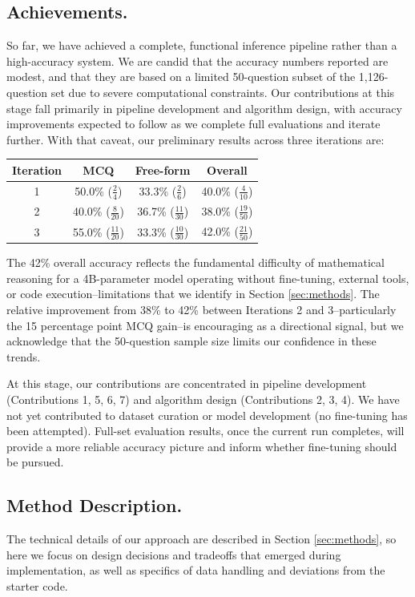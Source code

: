 \documentclass{article}
\begin{document}
\subsection{Achievements.}
So far, we have achieved a complete, functional inference pipeline rather than a high-accuracy system. We are candid that the accuracy numbers reported are modest, and that they are based on a limited 50-question subset of the 1,126-question set due to severe computational constraints. Our contributions at this stage fall primarily in pipeline development and algorithm design, with accuracy improvements expected to follow as we complete full evaluations and iterate further. With that caveat, our preliminary results across three iterations are:
\begin{center}
    \def\arraystretch{2.0}
    \begin{tabular}{||c | c c c||}
        \hline
        \textbf{Iteration} & \textbf{MCQ} & \textbf{Free-form} & \textbf{Overall}\\
        \hline
        1 & 50.0\% ($\frac{2}{4}$) & 33.3\% ($\frac{2}{6}$) & 40.0\% ($\frac{4}{10}$)\\
        \hline
        2 & 40.0\% ($\frac{8}{20}$) & 36.7\% ($\frac{11}{30}$) & 38.0\% ($\frac{19}{50}$)\\
        \hline
        3 & 55.0\% ($\frac{11}{20}$) & 33.3\% ($\frac{10}{30}$) & 42.0\% ($\frac{21}{50}$)\\
        \hline
    \end{tabular}
\end{center}
The 42\% overall accuracy reflects the fundamental difficulty of mathematical reasoning for a 4B-parameter model operating without fine-tuning, external tools, or code execution--limitations that we identify in Section \ref{sec:methods}. The relative improvement from 38\% to 42\% between Iterations 2 and 3--particularly the 15 percentage point MCQ gain--is encouraging as a directional signal, but we acknowledge that the 50-question sample size limits our confidence in these trends. 

At this stage, our contributions are concentrated in pipeline development (Contributions 1, 5, 6, 7) and algorithm design (Contributions 2, 3, 4). We have not yet contributed to dataset curation or model development (no fine-tuning has been attempted). Full-set evaluation results, once the current run completes, will provide a more reliable accuracy picture and inform whether fine-tuning should be pursued.

\subsection{Method Description.}
The technical details of our approach are described in Section \ref{sec:methods}, so here we focus on design decisions and tradeoffs that emerged during implementation, as well as specifics of data handling and deviations from the starter code.
\end{document}
